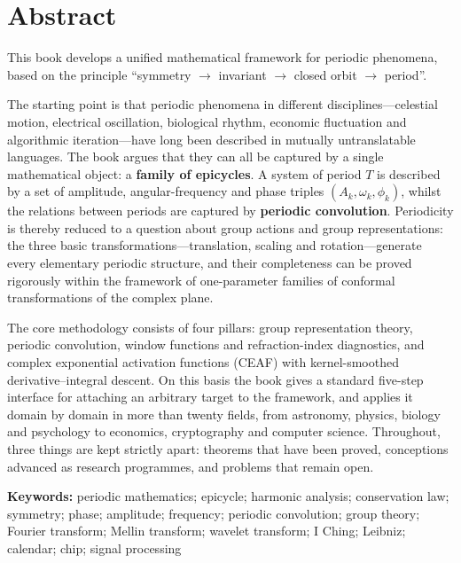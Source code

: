 \chapter*{Abstract}

This book develops a unified mathematical framework for periodic phenomena, based on the principle ``symmetry $\to$ invariant $\to$ closed orbit $\to$ period''.

The starting point is that periodic phenomena in different disciplines---celestial motion, electrical oscillation, biological rhythm, economic fluctuation and algorithmic iteration---have long been described in mutually untranslatable languages. The book argues that they can all be captured by a single mathematical object: a \textbf{family of epicycles}. A system of period $T$ is described by a set of amplitude, angular-frequency and phase triples $(A_k,\omega_k,\phi_k)$, whilst the relations between periods are captured by \textbf{periodic convolution}. Periodicity is thereby reduced to a question about group actions and group representations: the three basic transformations---translation, scaling and rotation---generate every elementary periodic structure, and their completeness can be proved rigorously within the framework of one-parameter families of conformal transformations of the complex plane.

The core methodology consists of four pillars: group representation theory, periodic convolution, window functions and refraction-index diagnostics, and complex exponential activation functions (CEAF) with kernel-smoothed derivative--integral descent. On this basis the book gives a standard five-step interface for attaching an arbitrary target to the framework, and applies it domain by domain in more than twenty fields, from astronomy, physics, biology and psychology to economics, cryptography and computer science. Throughout, three things are kept strictly apart: theorems that have been proved, conceptions advanced as research programmes, and problems that remain open.

\vspace{1em}
\noindent\textbf{Keywords:} periodic mathematics; epicycle; harmonic analysis; conservation law; symmetry; phase; amplitude; frequency; periodic convolution; group theory; Fourier transform; Mellin transform; wavelet transform; I Ching; Leibniz; calendar; chip; signal processing

\newpage
